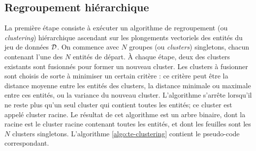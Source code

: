 




\subsection{Regroupement hiérarchique}
\label{subsec:te-clustering}

La première étape consiste à exécuter un algorithme de regroupement (ou \textit{clustering}) hiérarchique ascendant sur les plongements vectoriels des entités du jeu de données $\cal{D}$. %
On commence avec $N$ groupes (ou \textit{clusters}) singletons, chacun contenant l'une des $N$ entités de départ. À chaque étape, deux des clusters existants sont fusionnés pour former un nouveau cluster. Les clusters à fusionner sont choisis de sorte à minimiser un certain critère : ce critère peut être la distance moyenne entre les entités des clusters, la distance minimale ou maximale entre ces entités, ou la variance du nouveau cluster. 
L'algorithme s'arrête lorsqu'il ne reste plus qu'un seul cluster qui contient toutes les entités; ce cluster est appelé cluster racine. Le résultat de cet algorithme est un arbre binaire, dont la racine est le cluster racine contenant toutes les entités, et dont les feuilles sont les $N$ clusters singletons. L'algorithme \ref{algo:te-clustering} contient le pseudo-code correspondant.

